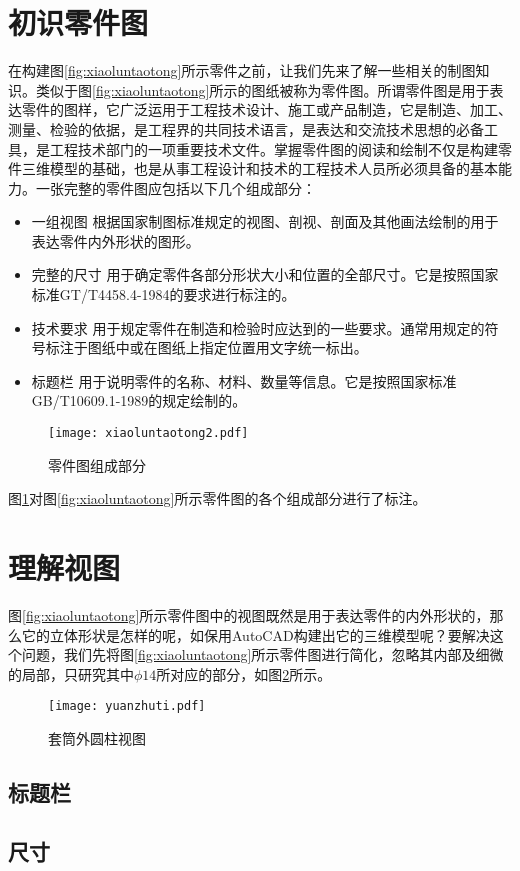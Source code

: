 \section{初识零件图}
在构建图\ref{fig:xiaoluntaotong}所示零件之前，让我们先来了解一些相关的制图知识。类似于图\ref{fig:xiaoluntaotong}所示的图纸被称为零件图。所谓零件图是用于表达零件的图样，它广泛运用于工程技术设计、施工或产品制造，它是制造、加工、测量、检验的依据，是工程界的共同技术语言，是表达和交流技术思想的必备工具，是工程技术部门的一项重要技术文件。掌握零件图的阅读和绘制不仅是构建零件三维模型的基础，也是从事工程设计和技术的工程技术人员所必须具备的基本能力。一张完整的零件图应包括以下几个组成部分：
\begin{itemize}
\item 一组视图
根据国家制图标准规定的视图、剖视、剖面及其他画法绘制的用于表达零件内外形状的图形。
\item 完整的尺寸
用于确定零件各部分形状大小和位置的全部尺寸。它是按照国家标准GT/T4458.4-1984的要求进行标注的。
\item 技术要求
用于规定零件在制造和检验时应达到的一些要求。通常用规定的符号标注于图纸中或在图纸上指定位置用文字统一标出。
\item 标题栏
用于说明零件的名称、材料、数量等信息。它是按照国家标准GB/T10609.1-1989的规定绘制的。
\end{itemize}
\begin{figure}[htbp]
\centering
\texttt{[image: xiaoluntaotong2.pdf]}
\caption{零件图组成部分}\label{fig:xiaoluntaotong2}
\end{figure}
图\ref{fig:xiaoluntaotong2}对图\ref{fig:xiaoluntaotong}所示零件图的各个组成部分进行了标注。
\section{理解视图}
图\ref{fig:xiaoluntaotong}所示零件图中的视图既然是用于表达零件的内外形状的，那么它的立体形状是怎样的呢，如保用AutoCAD构建出它的三维模型呢？要解决这个问题，我们先将图\ref{fig:xiaoluntaotong}所示零件图进行简化，忽略其内部及细微的局部，只研究其中$\phi 14$所对应的部分，如图\ref{fig:yuanzhuti}所示。
\begin{figure}[htbp]
\centering
\texttt{[image: yuanzhuti.pdf]}
\caption{套筒外圆柱视图}\label{fig:yuanzhuti}
\end{figure}
\subsection{标题栏}
\subsection{尺寸}

\endinput